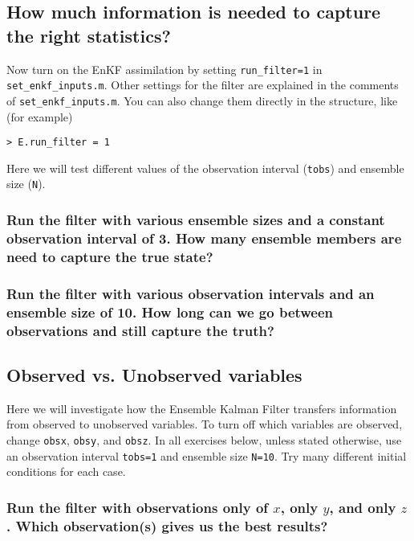 
\subsection{How much information is needed to capture the right statistics?}

Now turn on the EnKF assimilation by setting \texttt{run\_filter=1} in \texttt{set\_enkf\_inputs.m}.
Other settings for the filter are explained in the comments of \texttt{set\_enkf\_inputs.m}. 
You can also change them directly in the structure, like (for example)
\begin{verbatim}
> E.run_filter = 1
\end{verbatim}
Here we will test different values of the observation interval (\texttt{tobs}) and ensemble size (\texttt{N}).

\subsubsection{Run the filter with various ensemble sizes and a constant observation interval of 3. How many ensemble members are need to capture the true state?}
\subsubsection{Run the filter with various observation intervals and an ensemble size of 10. How long can we go between observations and still capture the truth?}

\subsection{Observed vs. Unobserved variables}

Here we will investigate how the Ensemble Kalman Filter transfers information from observed to unobserved variables.
To turn off which variables are observed, change \texttt{obsx}, \texttt{obsy}, and \texttt{obsz}. 
In all exercises below, unless stated otherwise, use an observation interval \texttt{tobs=1} and ensemble size \texttt{N=10}. 
Try many different initial conditions for each case. 

\subsubsection{Run the filter with observations only of $x$, only $y$, and only $z$. Which observation(s) gives us the best results?} 

